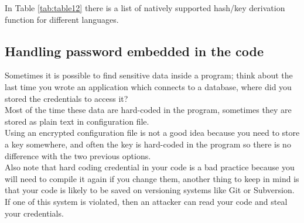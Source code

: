 In Table \ref{tab:table12} there is a list of natively supported hash/key derivation function for different languages.\\



\subsection{Handling password embedded in the code}
Sometimes it is possible to find sensitive data inside a program; think about the last time you wrote an application which connects to a database, where did you stored the credentials to access it?\\
Most of the time these data are hard-coded in the program, sometimes they are stored as plain text in configuration file.\\
Using an encrypted configuration file is not a good idea because you need to store a key somewhere, and often the key is hard-coded in the program so there is no difference with the two previous options.\\

Also note that hard coding credential in your code is a bad practice because you will need to compile it again if you change them, another thing to keep in mind is that your code is likely to be saved on versioning systems like Git or Subversion. If one of this system is violated, then an attacker can read your code and steal your credentials.\\

